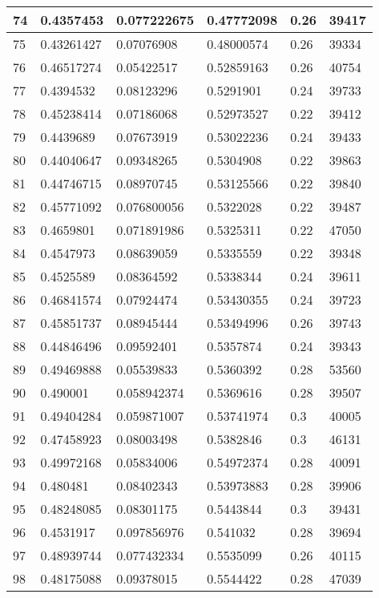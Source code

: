 \begin{longtable}{|l|l|l|l|l|l|}
74 & 0.4357453 & 0.077222675 & 0.47772098 & 0.26 & 39417 \\ \hline 
75 & 0.43261427 & 0.07076908 & 0.48000574 & 0.26 & 39334 \\ \hline 
76 & 0.46517274 & 0.05422517 & 0.52859163 & 0.26 & 40754 \\ \hline 
77 & 0.4394532 & 0.08123296 & 0.5291901 & 0.24 & 39733 \\ \hline 
78 & 0.45238414 & 0.07186068 & 0.52973527 & 0.22 & 39412 \\ \hline 
79 & 0.4439689 & 0.07673919 & 0.53022236 & 0.24 & 39433 \\ \hline 
80 & 0.44040647 & 0.09348265 & 0.5304908 & 0.22 & 39863 \\ \hline 
81 & 0.44746715 & 0.08970745 & 0.53125566 & 0.22 & 39840 \\ \hline 
82 & 0.45771092 & 0.076800056 & 0.5322028 & 0.22 & 39487 \\ \hline 
83 & 0.4659801 & 0.071891986 & 0.5325311 & 0.22 & 47050 \\ \hline 
84 & 0.4547973 & 0.08639059 & 0.5335559 & 0.22 & 39348 \\ \hline 
85 & 0.4525589 & 0.08364592 & 0.5338344 & 0.24 & 39611 \\ \hline 
86 & 0.46841574 & 0.07924474 & 0.53430355 & 0.24 & 39723 \\ \hline 
87 & 0.45851737 & 0.08945444 & 0.53494996 & 0.26 & 39743 \\ \hline 
88 & 0.44846496 & 0.09592401 & 0.5357874 & 0.24 & 39343 \\ \hline 
89 & 0.49469888 & 0.05539833 & 0.5360392 & 0.28 & 53560 \\ \hline 
90 & 0.490001 & 0.058942374 & 0.5369616 & 0.28 & 39507 \\ \hline 
91 & 0.49404284 & 0.059871007 & 0.53741974 & 0.3 & 40005 \\ \hline 
92 & 0.47458923 & 0.08003498 & 0.5382846 & 0.3 & 46131 \\ \hline 
93 & 0.49972168 & 0.05834006 & 0.54972374 & 0.28 & 40091 \\ \hline 
94 & 0.480481 & 0.08402343 & 0.53973883 & 0.28 & 39906 \\ \hline 
95 & 0.48248085 & 0.08301175 & 0.5443844 & 0.3 & 39431 \\ \hline 
96 & 0.4531917 & 0.097856976 & 0.541032 & 0.28 & 39694 \\ \hline 
97 & 0.48939744 & 0.077432334 & 0.5535099 & 0.26 & 40115 \\ \hline 
98 & 0.48175088 & 0.09378015 & 0.5544422 & 0.28 & 47039 \\ \hline 

\end{longtable}
